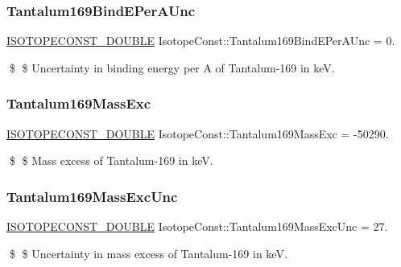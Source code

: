 \subsubsection{\texorpdfstring{Tantalum169\+Bind\+E\+Per\+A\+Unc}{Tantalum169BindEPerAUnc}}
{\footnotesize\ttfamily \mbox{\hyperlink{group___isotope_const-_macros_ga8f45a7272ce02c0b4c65c44636ed719a}{I\+S\+O\+T\+O\+P\+E\+C\+O\+N\+S\+T\+\_\+\+D\+O\+U\+B\+LE}} Isotope\+Const\+::\+Tantalum169\+Bind\+E\+Per\+A\+Unc = 0.}

\$ \$ Uncertainty in binding energy per A of Tantalum-\/169 in keV. \mbox{\label{group___isotope_const-_tantalum-_ta169_gabb57e7d082e4b55a7856478135bd2e98}} 
\subsubsection{\texorpdfstring{Tantalum169\+Mass\+Exc}{Tantalum169MassExc}}
{\footnotesize\ttfamily \mbox{\hyperlink{group___isotope_const-_macros_ga8f45a7272ce02c0b4c65c44636ed719a}{I\+S\+O\+T\+O\+P\+E\+C\+O\+N\+S\+T\+\_\+\+D\+O\+U\+B\+LE}} Isotope\+Const\+::\+Tantalum169\+Mass\+Exc = -\/50290.}

\$ \$ Mass excess of Tantalum-\/169 in keV. \mbox{\label{group___isotope_const-_tantalum-_ta169_gaa68f4626a06c5411b6ba7b1151c7585f}} 
\subsubsection{\texorpdfstring{Tantalum169\+Mass\+Exc\+Unc}{Tantalum169MassExcUnc}}
{\footnotesize\ttfamily \mbox{\hyperlink{group___isotope_const-_macros_ga8f45a7272ce02c0b4c65c44636ed719a}{I\+S\+O\+T\+O\+P\+E\+C\+O\+N\+S\+T\+\_\+\+D\+O\+U\+B\+LE}} Isotope\+Const\+::\+Tantalum169\+Mass\+Exc\+Unc = 27.}

\$ \$ Uncertainty in mass excess of Tantalum-\/169 in keV. \mbox{\label{group___isotope_const-_tantalum-_ta169_gaae308a77cb96c54855d61d99bdbabcdd}} 
